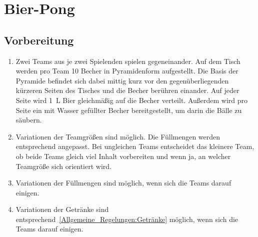 \chapter{Bier-Pong}
\section{Vorbereitung}
\begin{enumerate}[label={(\arabic*)}]
    \item
    Zwei Teams aus je zwei Spielenden spielen gegeneinander.
    Auf dem Tisch werden pro Team 10 Becher in Pyramidenform aufgestellt.
    Die Basis der Pyramide befindet sich dabei mittig kurz vor den gegenüberliegenden kürzeren Seiten des Tisches und die Becher berühren einander.
    Auf jeder Seite wird \SI{1}{\liter} Bier gleichmäßig auf die Becher verteilt.
    Außerdem wird pro Seite ein mit Wasser gefüllter Becher bereitgestellt, um darin die Bälle zu säubern.

    \item
    Variationen der Teamgrößen sind möglich.
    Die Füllmengen werden entsprechend angepasst.
    Bei ungleichen Teams entscheidet das kleinere Team, ob beide Teams gleich viel Inhalt vorbereiten und wenn ja, an welcher Teamgröße sich orientiert wird.

    \item
    Variationen der Füllmengen sind möglich, wenn sich die Teams darauf einigen.

    \item
    Variationen der Getränke sind entsprechend~\ref{Allgemeine_Regelungen:Getränke} möglich, wenn sich die Teams darauf einigen.
\end{enumerate}

